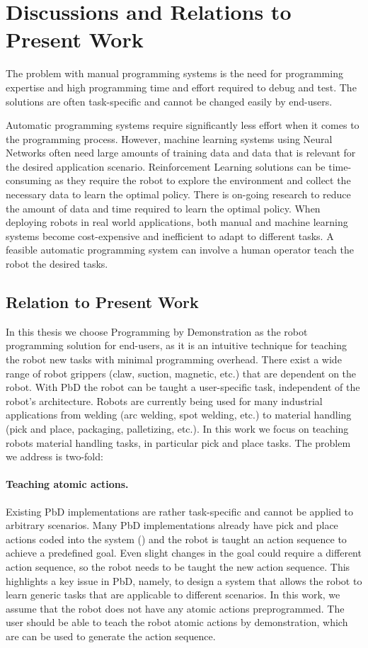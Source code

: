 \section{Discussions and Relations to Present Work}
The problem with manual programming systems is the need for programming expertise and high programming time and effort required to debug and test.
The solutions are often task-specific and cannot be changed easily by end-users.

Automatic programming systems require significantly less effort when it comes to the programming process. 
However, machine learning systems using Neural Networks often need large amounts of training data and data that is relevant for the desired application scenario.
Reinforcement Learning solutions can be time-consuming as they require the robot to explore the environment and collect the necessary data to learn the optimal policy.
There is on-going research to reduce the amount of data and time required to learn the optimal policy.
When deploying robots in real world applications, both manual and machine learning systems become cost-expensive and inefficient to adapt to different tasks.
A feasible automatic programming system can involve a human operator teach the robot the desired tasks.


\subsection{Relation to Present Work}
In this thesis we choose Programming by Demonstration as the robot programming solution for end-users, as it is an intuitive technique for teaching the robot new tasks with minimal programming overhead.
There exist a wide range of robot grippers (claw, suction, magnetic, etc.) that are dependent on the robot.
With PbD the robot can be taught a user-specific task, independent of the robot's architecture.
Robots are currently being used for many industrial applications from welding (arc welding, spot welding, etc.) to material handling (pick and place, packaging, palletizing, etc.).
In this work we focus on teaching robots material handling tasks, in particular pick and place tasks.
The problem we address is two-fold:
\paragraph{Teaching atomic actions.}
Existing PbD implementations are rather task-specific and cannot be applied to arbitrary scenarios.
Many PbD implementations already have pick and place actions coded into the system (\cite{veeraraghavan2008teaching}) and the robot is taught an action sequence to achieve a predefined goal.
Even slight changes in the goal could require a different action sequence, so the robot needs to be taught the new action sequence.
This highlights a key issue in PbD, namely, to design a system that allows the robot to learn  generic tasks that are applicable to different scenarios.
In this work, we assume that the robot does not have any atomic actions preprogrammed.
The user should be able to teach the robot atomic actions by demonstration, which are can be used to generate the action sequence.

